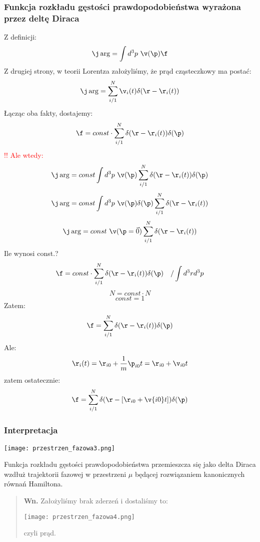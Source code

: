 \subsubsection{Funkcja rozkładu gęstości prawdopodobieństwa wyrażona przez deltę Diraca}
Z definicji:
\begin{equation}\j\arg=\int d^3 p~\v(\p)\f\end{equation}
Z drugiej strony, w teorii Lorentza założyliśmy, że prąd cząsteczkowy ma postać:
\begin{equation}\j\arg=\sum_{i/1}^N\v_i(t)\delta(\r-\r_i(t))\end{equation}
Łącząc oba fakty, dostajemy:
\begin{equation}\f=const\cdot\sum_{i/1}^N\delta(\r-\r_i(t))\delta(\p)
\end{equation}
\textcolor{red}{!! Ale wtedy:
\begin{equation}\j\arg=const \int d^3p~\v(\p)\sum_{i/1}^N\delta(\r-\r_i(t))\delta(\p)\end{equation}
\begin{equation}\j\arg= const \int d^3p~\v(\p) \delta(\p) \sum_{i/1}^N\delta(\r-\r_i(t))
\end{equation}
\begin{equation}\j\arg=const~\v(\p=\vec{0}) \sum_{i/1}^N\delta(\r-\r_i(t))
\end{equation}}
Ile wynosi const.?
\begin{equation}\f=const\cdot\sum_{i/1}^N\delta(\r-\r_i(t))\delta(\p)~~~/\int d^3rd^3p \nonumber \end{equation}
\begin{equation}N=const\cdot N \nonumber \end{equation}
\begin{equation}const=1 \nonumber \end{equation}
Zatem:
\begin{equation}\f=\sum_{i/1}^N\delta(\r-\r_i(t))\delta(\p) \end{equation}
Ale:
\begin{equation}\r_i(t)=\r_{i0}+\frac{1}{m}\p_{i0}t=\r_{i0}+\v_{i0}t\end{equation}
zatem ostatecznie:
\begin{equation}\f=\sum_{i/1}^N\delta(\r-[\r_{i0}+\v{i0}t])\delta(\p) \end{equation}
\subsubsection{Interpretacja}
\begin{center}
\texttt{[image: przestrzen\_fazowa3.png]}
\end{center}
Funkcja rozkładu gęstości prawdopodobieństwa przemieszcza się jako delta Diraca wzdłuż trajektorii fazowej w przestrzeni $\mu$ będącej rozwiązaniem kanonicznych równań Hamiltona.\\
\begin{verse}\textbf{Wn. }Założyliśmy brak zderzeń i dostaliśmy to:
\begin{center}\texttt{[image: przestrzen\_fazowa4.png]}\end{center}
czyli prąd. \end{verse}



